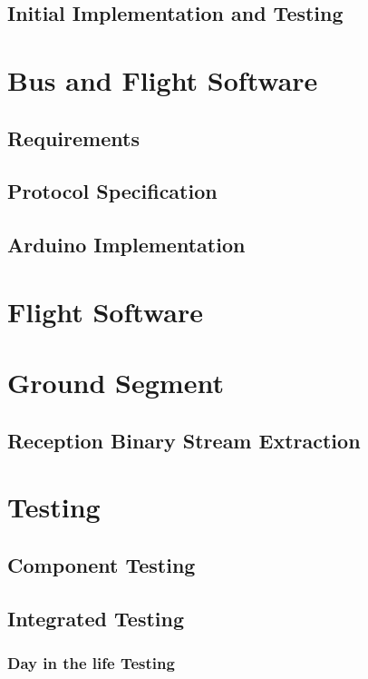 \subsection{Initial Implementation and Testing}

\section{Bus and Flight Software}

\subsection{Requirements}

\subsection{Protocol Specification}

\subsection{Arduino Implementation}

\section{Flight Software}

\section{Ground Segment}

\subsection{Reception Binary Stream Extraction}

\section{Testing}

\subsection{Component Testing}

\subsection{Integrated Testing}

\subsubsection{Day in the life Testing}

